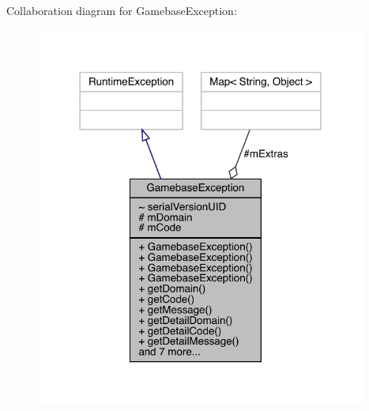 Collaboration diagram for Gamebase\+Exception\+:
\nopagebreak
\begin{figure}[H]
\begin{center}
\leavevmode
\includegraphics[width=308pt]{classcom_1_1toast_1_1android_1_1gamebase_1_1base_1_1_gamebase_exception__coll__graph}
\end{center}
\end{figure}
